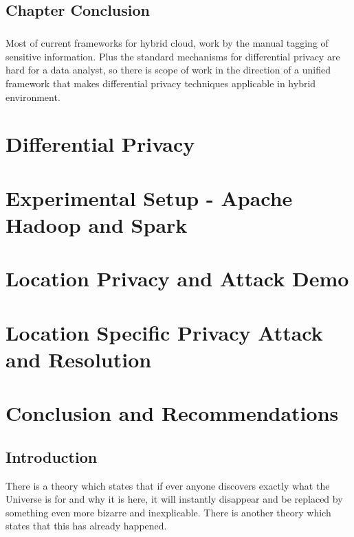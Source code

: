 \documentclass{report}
\begin{document}
\section{Chapter Conclusion}
\paragraph{}
Most of current frameworks for hybrid cloud, work by the manual tagging of sensitive information. Plus the standard mechanisms for differential privacy are hard for a data analyst, so there is scope of work in the direction of a unified framework that makes differential privacy techniques applicable in hybrid environment. 




\chapter{Differential Privacy}




\chapter{Experimental Setup - Apache Hadoop and Spark}



\chapter{Location Privacy and Attack Demo }

\chapter{Location Specific Privacy Attack and Resolution}




\chapter{Conclusion and Recommendations}

\section{Introduction}
There is a theory which states that if ever anyone discovers exactly what the Universe is for and why it is here, it will instantly disappear and be replaced by something even more bizarre and inexplicable.
There is another theory which states that this has already happened.
\end{document}
